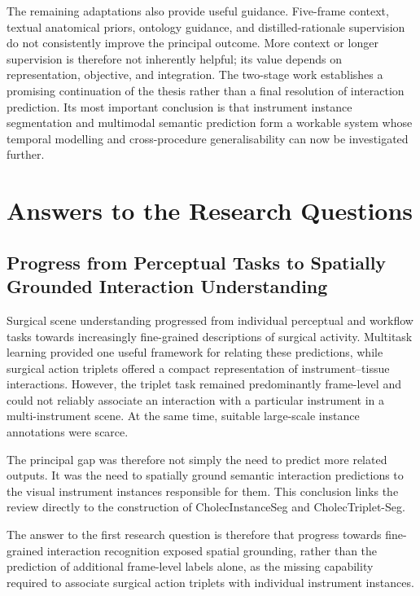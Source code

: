 The remaining adaptations also provide useful guidance. Five-frame context, textual anatomical priors, ontology guidance, and distilled-rationale supervision do not consistently improve the principal outcome. More context or longer supervision is therefore not inherently helpful; its value depends on representation, objective, and integration. The two-stage work establishes a promising continuation of the thesis rather than a final resolution of interaction prediction. Its most important conclusion is that instrument instance segmentation and multimodal semantic prediction form a workable system whose temporal modelling and cross-procedure generalisability can now be investigated further.

\section{Answers to the Research Questions}
\label{sec:discussion-research-questions}

\subsection{Progress from Perceptual Tasks to Spatially Grounded Interaction Understanding}
\label{sec:discussion-rq1}

Surgical scene understanding progressed from individual perceptual and workflow tasks towards increasingly fine-grained descriptions of surgical activity. Multitask learning provided one useful framework for relating these predictions, while surgical action triplets offered a compact representation of instrument--tissue interactions. However, the triplet task remained predominantly frame-level and could not reliably associate an interaction with a particular instrument in a multi-instrument scene. At the same time, suitable large-scale instance annotations were scarce.

The principal gap was therefore not simply the need to predict more related outputs. It was the need to spatially ground semantic interaction predictions to the visual instrument instances responsible for them. This conclusion links the review directly to the construction of CholecInstanceSeg and CholecTriplet-Seg.

The answer to the first research question is therefore that progress towards fine-grained interaction recognition exposed spatial grounding, rather than the prediction of additional frame-level labels alone, as the missing capability required to associate surgical action triplets with individual instrument instances.

